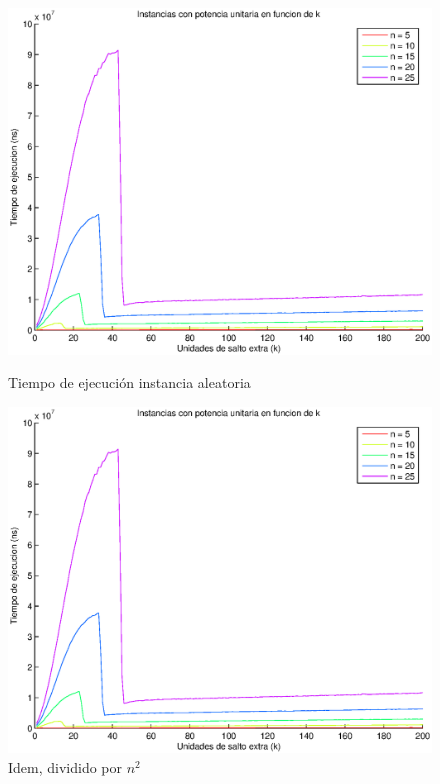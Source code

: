 \begin{figure}[H]
  \begin{minipage}{0.5\linewidth}
    \includegraphics[width=\linewidth]{img/problema3/instancia_p_1_varios_n.eps}
    \caption{Tiempo de ejecución instancia aleatoria}\label{fig:problema3-n}
  \end{minipage}
  \hfill
  \begin{minipage}{0.5\linewidth}
    \includegraphics[width=\linewidth]{img/problema3/instancia_p_1_varios_n_div_n2.eps}
    \caption{Idem, dividido por $n^2$}\label{fig:problema3-n-n2}
  \end{minipage}
\end{figure}

